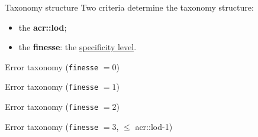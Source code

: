 \documentclass[10pt]{beamer}
\begin{document}
        \begin{frame}{Taxonomy structure}
            Two criteria determine the taxonomy structure:
            \begin{itemize}[label=$\blacktriangleright$, font=\color{IGNGreen}, itemsep=2em]
                \item<2-> the \textbf{\acrfull{acr::lod}};
                \item<3-> the \textbf{finesse}: the \underline{specificity level}.
            \end{itemize}
        \end{frame}
        \begin{frame}{Error taxonomy (\texttt{finesse} $= 0$)}
            
        \end{frame}
        \begin{frame}{Error taxonomy (\texttt{finesse} $= 1$)}
            
        \end{frame}
        \begin{frame}{Error taxonomy (\texttt{finesse} $= 2$)}
            \only<1|handout:0>{
                
            }
        \end{frame}
        \begin{frame}{Error taxonomy (\texttt{finesse} $= 3$, $\leq$ \acrshort{acr::lod}-1)}
            
        \end{frame}
\end{document}
